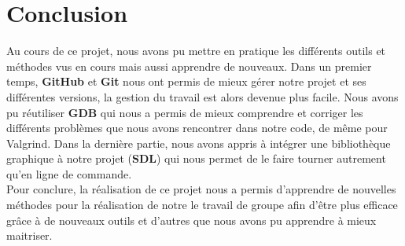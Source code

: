 \documentclass[12pt]{article}
\begin{document}
\section{Conclusion}
Au cours de ce projet, nous avons pu mettre en pratique les différents outils et méthodes vus en cours mais aussi apprendre de nouveaux. Dans un premier temps, \textbf{GitHub} et \textbf{Git} nous ont permis de mieux gérer notre projet et ses différentes versions, la gestion du travail est alors devenue plus facile. Nous avons pu réutiliser \textbf{GDB} qui nous a permis de mieux comprendre et corriger les différents problèmes que nous avons rencontrer dans notre code, de même pour Valgrind. Dans la dernière partie, nous avons appris à intégrer une bibliothèque graphique à notre projet (\textbf{SDL}) qui nous permet de le faire tourner autrement qu'en ligne de commande.
\\Pour conclure, la réalisation de ce projet nous a permis d'apprendre de nouvelles méthodes pour la réalisation de notre le travail de groupe afin d'être plus efficace grâce à de nouveaux outils et d'autres que nous avons pu apprendre à mieux maitriser.
\end{document}
